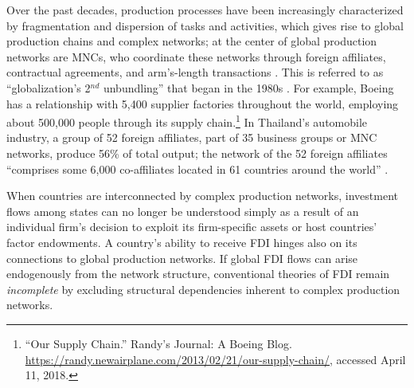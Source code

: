 \documentclass[reqno,onecolumn,letterpaper,12pt]{article}
\begin{document}

Over the past decades, production processes have been increasingly characterized by fragmentation and dispersion of tasks and activities, which gives rise to global production chains and complex networks; at the center of global production networks are MNCs, who coordinate these networks through foreign affiliates, contractual agreements, and arm's-length transactions \citep{UNCTAD:2013}.  This is referred to as ``globalization's 2$^{nd}$ unbundling'' that began in the 1980s \citep{Baldwin:2011}. %
For example, Boeing has a relationship with 5,400 supplier factories throughout the world, employing about 500,000 people through its supply chain.\footnote{``Our Supply Chain.'' Randy's Journal: A Boeing Blog. \url{https://randy.newairplane.com/2013/02/21/our-supply-chain/}, accessed April 11, 2018.} In Thailand's automobile industry, a group of 52 foreign affiliates, part of 35 business groups or MNC networks, produce 56\% of total output; the network of the 52 foreign affiliates ``comprises some 6,000 co-affiliates located in 61 countries around the world'' \citep[137]{UNCTAD:2013}.

When countries are interconnected by complex production networks, investment flows among states can no longer be understood simply as a result of an individual firm's decision to exploit its firm-specific assets or host countries' factor endowments. A country's ability to receive FDI hinges also on its connections to global production networks. If global FDI flows can arise endogenously from the network structure, conventional theories of FDI remain \textit{incomplete} by excluding structural dependencies inherent to complex production networks.
\end{document}
